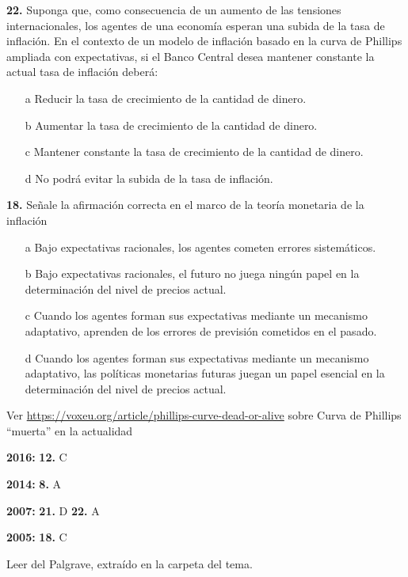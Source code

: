 \documentclass{nuevotema}
\begin{document}
\textbf{22.} Suponga que, como consecuencia de un aumento de las tensiones internacionales, los agentes de una economía esperan una subida de la tasa de inflación. En el contexto de un modelo de inflación basado en la curva de Phillips ampliada con expectativas, si el Banco Central desea mantener constante la actual tasa de inflación deberá:

\begin{itemize}
	\item[a] Reducir la tasa de crecimiento de la cantidad de dinero.
	\item[b] Aumentar la tasa de crecimiento de la cantidad de dinero.
	\item[c] Mantener constante la tasa de crecimiento de la cantidad de dinero.
	\item[d] No podrá evitar la subida de la tasa de inflación.
\end{itemize}

\textbf{18.} Señale la afirmación correcta en el marco de la teoría monetaria de la inflación

\begin{itemize}
	\item[a] Bajo expectativas racionales, los agentes cometen errores sistemáticos.
	\item[b] Bajo expectativas racionales, el futuro no juega ningún papel en la determinación del nivel de precios actual.
	\item[c] Cuando los agentes forman sus expectativas mediante un mecanismo adaptativo, aprenden de los errores de previsión cometidos en el pasado.
	\item[d] Cuando los agentes forman sus expectativas mediante un mecanismo adaptativo, las políticas monetarias futuras juegan un papel esencial en la determinación del nivel de precios actual.
\end{itemize}

\notas

Ver \url{https://voxeu.org/article/phillips-curve-dead-or-alive} sobre Curva de Phillips ``muerta'' en la actualidad

\textbf{2016:} \textbf{12.} C

\textbf{2014:} \textbf{8.} A

\textbf{2007:} \textbf{21.} D \textbf{22.} A

\textbf{2005:} \textbf{18.} C

Leer  del Palgrave, extraído en la carpeta del tema.
\end{document}
